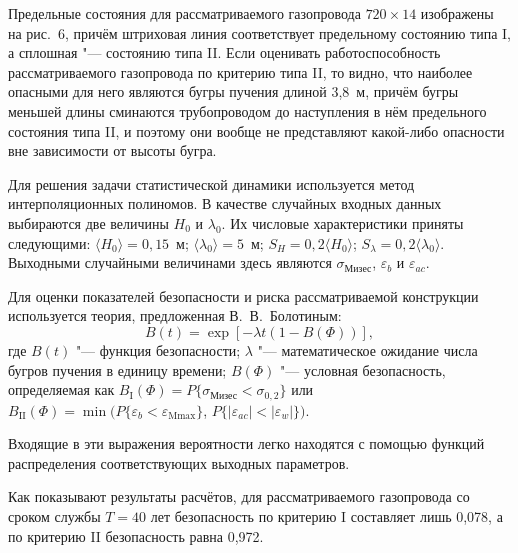 
Предельные состояния для рассматриваемого газопровода $720\times
14$ изображены на рис.~6, причём штриховая линия соответствует
предельному состоянию типа I, а сплошная "--- состоянию типа II.
Если оценивать работоспособность рассматриваемого газопровода по
критерию типа II, то видно, что наиболее опасными для него
являются бугры пучения длиной 3,8~м, причём бугры меньшей длины
сминаются трубопроводом до наступления в нём предельного состояния
типа II, и поэтому они вообще не представляют какой-либо опасности
вне зависимости от высоты бугра.

Для решения задачи статистической динамики используется метод
интерполяционных полиномов. В качестве случайных входных данных
выбираются две величины $H_0 $ и $\lambda _0 $. Их числовые
характеристики приняты следующими: $\langle H_0 \rangle = 0,15$~м;
$\langle \lambda _0 \rangle = 5$~м; $S_H =0,2\langle H_0 \rangle
$; $S_\lambda =0,2\langle \lambda _0 \rangle $. Выходными
случайными величинами здесь являются $\sigma _{\text{Мизес}} $,
$\varepsilon _b$ и $\varepsilon _{ac}$.

Для оценки показателей безопасности и риска рассматриваемой
конструкции используется теория, предложенная В.~В.~Болотиным:
$$B(t)=\exp[ -\lambda t ( 1-B(\Phi ))],$$ где $B(t)$ "--- функция
безопасности; $\lambda $ "--- математическое ожидание числа бугров
пучения в единицу времени; $B(\Phi )$ "--- условная безопасность,
определяемая как $B_\text{I} (\Phi )=P\{\sigma _{\text{Мизес}}
{<}\sigma _{0,2} \}$ или $B_{\text{II}} (\Phi )=\min (
P\{\varepsilon _b {<}\varepsilon _{\text{Mmax}} \}$,
\mbox{$P\{|\varepsilon _{ac} |{<}|\varepsilon _w|\})$.}

Входящие в эти выражения вероятности легко находятся с помощью функций
распределения соответствующих выходных параметров.

Как показывают результаты расчётов, для рассматриваемого
газопровода со сроком службы $T = 40$ лет безопасность по критерию
I составляет лишь 0,078, а по критерию II  безопасность равна
0,972.


